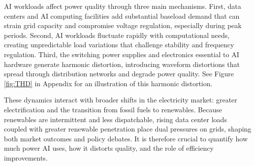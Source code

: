 \documentclass[sigconf,authordraft]{acmart}
\begin{document}
AI workloads affect power quality through three main mechanisms. First, data centers and AI computing facilities add substantial baseload demand that can strain grid capacity and compromise voltage regulation, especially during peak periods. Second, AI workloads fluctuate rapidly with computational needs, creating unpredictable load variations that challenge stability and frequency regulation. Third, the switching power supplies and electronics essential to AI hardware generate harmonic distortion, introducing waveform distortions that spread through distribution networks and degrade power quality. See Figure \ref{fig:THD} in Appendix for an illustration of this harmonic distortion.




These dynamics interact with broader shifts in the electricity market: greater electrification and the transition from fossil fuels to renewables. Because renewables are intermittent and less dispatchable, rising data center loads coupled with greater renewable penetration place dual pressures on grids, shaping both market outcomes and policy debates. It is therefore crucial to quantify how much power AI uses, how it distorts quality, and the role of efficiency improvements.
\end{document}
